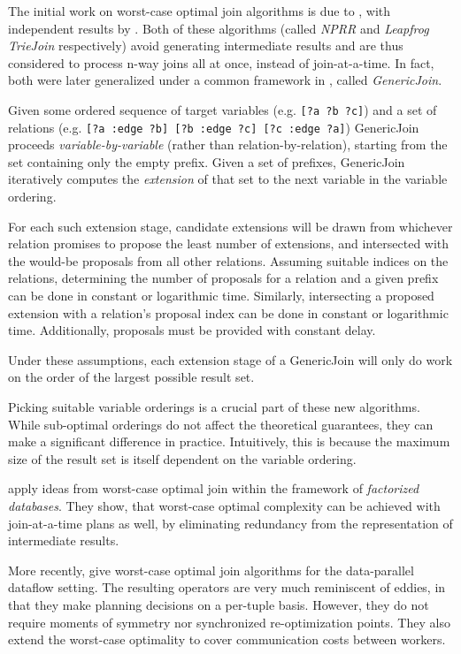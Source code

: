 \documentclass[../index.tex]{subfiles}
\begin{document}
The initial work on worst-case optimal join algorithms is due to
\cite{ngo2012worst}, with independent results by
\cite{veldhuizen2012leapfrog}. Both of these algorithms (called
\emph{NPRR} and \emph{Leapfrog TrieJoin} respectively) avoid
generating intermediate results and are thus considered to process
n-way joins all at once, instead of join-at-a-time. In fact, both were
later generalized under a common framework in \cite{ngo2013skew},
called \emph{GenericJoin}.

Given some ordered sequence of target variables (e.g. \texttt{[?a ?b
    ?c]}) and a set of relations (e.g. \texttt{{[?a :edge ?b] [?b
      :edge ?c] [?c :edge ?a]}}) GenericJoin proceeds
\emph{variable-by-variable} (rather than relation-by-relation),
starting from the set containing only the empty prefix. Given a set of
prefixes, GenericJoin iteratively computes the \emph{extension} of
that set to the next variable in the variable ordering.

For each such extension stage, candidate extensions will be drawn from
whichever relation promises to propose the least number of extensions,
and intersected with the would-be proposals from all other
relations. Assuming suitable indices on the relations, determining the
number of proposals for a relation and a given prefix can be done in
constant or logarithmic time. Similarly, intersecting a proposed
extension with a relation's proposal index can be done in constant or
logarithmic time. Additionally, proposals must be provided with
constant delay.

Under these assumptions, each extension stage of a GenericJoin will
only do work on the order of the largest possible result set.

Picking suitable variable orderings is a crucial part of these new
algorithms. While sub-optimal orderings do not affect the theoretical
guarantees, they can make a significant difference in
practice. Intuitively, this is because the maximum size of the result
set is itself dependent on the variable ordering.

\cite{ciucanu2015worst} apply ideas from worst-case optimal join
within the framework of \emph{factorized databases}. They show, that
worst-case optimal complexity can be achieved with join-at-a-time
plans as well, by eliminating redundancy from the representation of
intermediate results.

More recently, \cite{ammar2018distributed} give worst-case optimal
join algorithms for the data-parallel dataflow setting. The resulting
operators are very much reminiscent of eddies, in that they make
planning decisions on a per-tuple basis. However, they do not require
moments of symmetry nor synchronized re-optimization points. They also
extend the worst-case optimality to cover communication costs between
workers.
\end{document}
